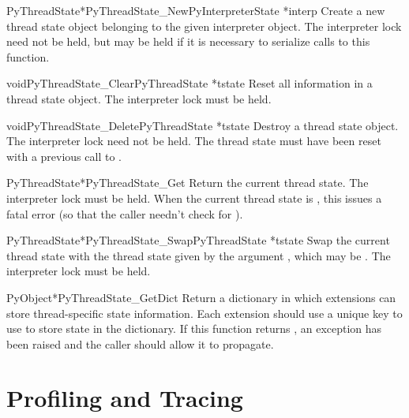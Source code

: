 \begin{cfuncdesc}{PyThreadState*}{PyThreadState_New}{PyInterpreterState *interp}
  Create a new thread state object belonging to the given interpreter
  object.  The interpreter lock need not be held, but may be held if
  it is necessary to serialize calls to this function.
\end{cfuncdesc}

\begin{cfuncdesc}{void}{PyThreadState_Clear}{PyThreadState *tstate}
  Reset all information in a thread state object.  The interpreter lock
  must be held.
\end{cfuncdesc}

\begin{cfuncdesc}{void}{PyThreadState_Delete}{PyThreadState *tstate}
  Destroy a thread state object.  The interpreter lock need not be
  held.  The thread state must have been reset with a previous call to
  .
\end{cfuncdesc}

\begin{cfuncdesc}{PyThreadState*}{PyThreadState_Get}{}
  Return the current thread state.  The interpreter lock must be
  held.  When the current thread state is \NULL, this issues a fatal
  error (so that the caller needn't check for \NULL).
\end{cfuncdesc}

\begin{cfuncdesc}{PyThreadState*}{PyThreadState_Swap}{PyThreadState *tstate}
  Swap the current thread state with the thread state given by the
  argument , which may be \NULL.  The interpreter lock
  must be held.
\end{cfuncdesc}

\begin{cfuncdesc}{PyObject*}{PyThreadState_GetDict}{}
  Return a dictionary in which extensions can store thread-specific
  state information.  Each extension should use a unique key to use to
  store state in the dictionary.  If this function returns \NULL, an
  exception has been raised and the caller should allow it to
  propagate.
\end{cfuncdesc}


\section{Profiling and Tracing \label{profiling}}


